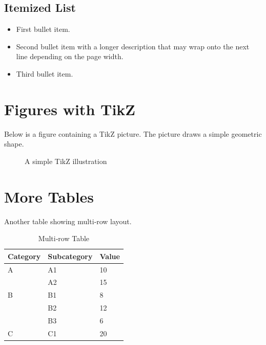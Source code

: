 \documentclass{article}
\begin{document}
\subsection{Itemized List}
\begin{itemize}
\item First bullet item.
\item Second bullet item with a longer description that may wrap onto the next line depending on the page width.
\item Third bullet item.
\end{itemize}

\lipsum[7-9]

\section{Figures with TikZ}
Below is a figure containing a TikZ picture. The picture draws a simple geometric shape.

\begin{figure}[htbp]
\centering
{}
\caption{A simple TikZ illustration}
\label{fig:tikzsample}
\end{figure}

\lipsum[10-12]

\section{More Tables}
Another table showing multi‑row layout.

\begin{table}[htbp]
\centering
\caption{Multi‑row Table}
\label{tab:multirow}
\begin{tabular}{lll}
\toprule
\textbf{Category} & \textbf{Subcategory} & \textbf{Value} \\
\midrule
A & A1 & 10 \\
  & A2 & 15 \\
B & B1 & 8 \\
  & B2 & 12 \\
  & B3 & 6 \\
C & C1 & 20 \\
\bottomrule
\end{tabular}
\end{table}
\end{document}
